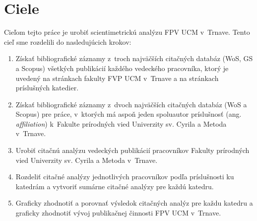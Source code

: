 \chapter{Ciele}

Cieľom tejto práce je urobiť scientimetrickú analýzu FPV UCM v~Trnave.  Tento
cieľ sme rozdelili do nasledujúcich krokov:

\begin{enumerate}
  \item Získať bibliografické záznamy z~troch najväčších citačných databáz
    (WoS, GS a Scopus) všetkých publikácií každého vedeckého pracovníka, ktorý
    je uvedený na stránkach fakulty FVP UCM v~Trnave a na stránkach príslušných
    katedier.
  \item Získať bibliografické záznamy z~dvoch najväčších citačných databáz (WoS
    a Scopus) pre práce, v~ktorých má aspoň jeden spoluautor príslušnosť
    (ang.\,\emph{affiliation}) k~Fakulte prírodných vied Univerzity sv. Cyrila
    a Metoda v~Trnave.
  \item Urobiť citačnú analýzu vedeckých publikácií pracovníkov
    Fakulty prírodných vied Univerzity sv. Cyrila a Metoda v~Trnave.
  \item Rozdeliť citačné analýzy jednotlivých pracovníkov podľa príslušnosti ku
    katedrám a vytvoriť sumárne citačné analýzy pre každú katedru.
  \item Graficky zhodnotiť a porovnať výsledok citačných analýz pre každu
    katedru a graficky zhodnotiť vývoj publikačnej činnosti FPV UCM v~Trnave.
\end{enumerate}


